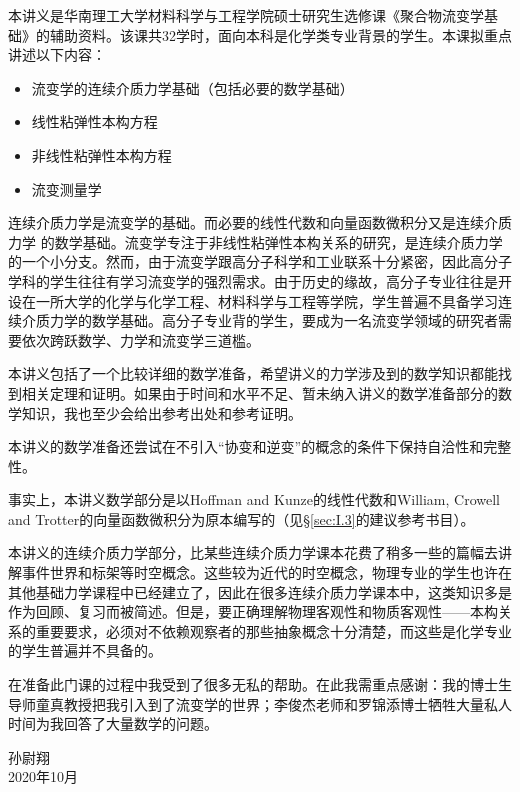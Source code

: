 \documentclass[main.tex]{subfiles}
\begin{document}
本讲义是华南理工大学材料科学与工程学院硕士研究生选修课《聚合物流变学基础》的辅助资料。该课共32学时，面向本科是化学类专业背景的学生。本课拟重点讲述以下内容：

\begin{itemize}
    \item 流变学的连续介质力学基础（包括必要的数学基础）
    \item 线性粘弹性本构方程
    \item 非线性粘弹性本构方程
    \item 流变测量学
\end{itemize}

连续介质力学是流变学的基础。而必要的线性代数和向量函数微积分又是连续介质力学 的数学基础。流变学专注于非线性粘弹性本构关系的研究，是连续介质力学的一个小分支。然而，由于流变学跟高分子科学和工业联系十分紧密，因此高分子学科的学生往往有学习流变学的强烈需求。由于历史的缘故，高分子专业往往是开设在一所大学的化学与化学工程、材料科学与工程等学院，学生普遍不具备学习连续介质力学的数学基础。高分子专业背的学生，要成为一名流变学领域的研究者需要依次跨跃数学、力学和流变学三道槛。

本讲义包括了一个比较详细的数学准备，希望讲义的力学涉及到的数学知识都能找到相关定理和证明。如果由于时间和水平不足、暂未纳入讲义的数学准备部分的数学知识，我也至少会给出参考出处和参考证明。

本讲义的数学准备还尝试在不引入“协变和逆变”的概念的条件下保持自洽性和完整性。

事实上，本讲义数学部分是以Hoffman and Kunze的线性代数和William, Crowell and Trotter的向量函数微积分为原本编写的（见\S \ref{sec:I.3}的建议参考书目）。

本讲义的连续介质力学部分，比某些连续介质力学课本花费了稍多一些的篇幅去讲解事件世界和标架等时空概念。这些较为近代的时空概念，物理专业的学生也许在其他基础力学课程中已经建立了，因此在很多连续介质力学课本中，这类知识多是作为回顾、复习而被简述。但是，要正确理解物理客观性和物质客观性——本构关系的重要要求，必须对不依赖观察者的那些抽象概念十分清楚，而这些是化学专业的学生普遍并不具备的。

在准备此门课的过程中我受到了很多无私的帮助。在此我需重点感谢：我的博士生导师童真教授把我引入到了流变学的世界；李俊杰老师和罗锦添博士牺牲大量私人时间为我回答了大量数学的问题。

\begin{flushright}
孙尉翔\\
2020年10月
\end{flushright}
\end{document}
